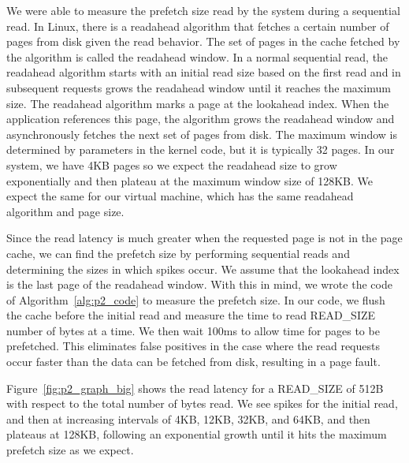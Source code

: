 We were able to measure the prefetch size read by the system during a sequential 
read. In Linux, there is a readahead algorithm that fetches a certain number of 
pages from disk given the read behavior. The set of pages in the cache fetched by 
the algorithm is called the readahead window. In a normal sequential read, the 
readahead algorithm starts with an initial read size based on the first read and in
subsequent requests grows the readahead window until it reaches the maximum size. 
The readahead algorithm marks a page at the lookahead index. When the application 
references this page, the algorithm grows the readahead window and asynchronously 
fetches the next set of pages from disk. The maximum window is determined by 
parameters in the kernel code, but it is typically 32 pages. In our system, we have
4KB pages so we expect the readahead size to grow exponentially and then plateau at
the maximum window size of 128KB. We expect the same for our virtual machine, which has the same readahead algorithm and page size.

Since the read latency is much greater when the requested page is not in the page 
cache, we can find the prefetch size by performing sequential reads and determining
the sizes in which spikes occur. We assume that the lookahead index is the last 
page of the readahead window. With this in mind, we wrote the code of 
Algorithm~\ref{alg:p2_code} to measure the prefetch size. In our code, we flush 
the cache before the initial read and measure the time to read READ\_SIZE number of
bytes at a time. We then wait 100ms to allow time for pages to be prefetched. This
eliminates false positives in the case where the read requests occur faster than
the data can be fetched from disk, resulting in a page fault.


Figure~\ref{fig:p2_graph_big} shows the read latency for a READ\_SIZE of 512B with
respect to the total number of bytes read. We see spikes for the initial read, and
then at increasing intervals of 4KB, 12KB, 32KB, and 64KB, and then plateaus at 
128KB, following an exponential growth until it hits the maximum prefetch size as 
we expect.  

